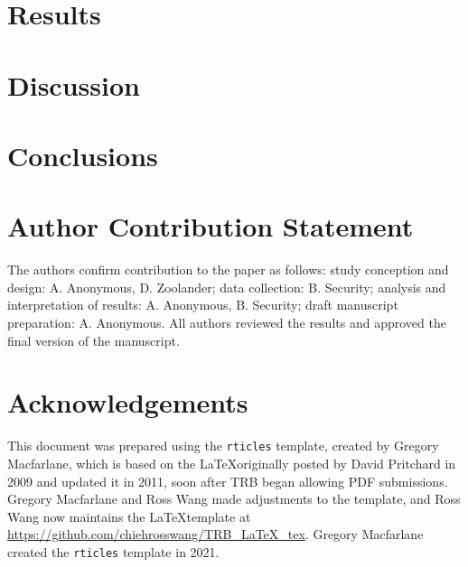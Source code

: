 \documentclass[numbered]{trbunofficial}
\begin{document}
\hypertarget{results}{%
\section{Results}\label{results}}

\hypertarget{discussion}{%
\section{Discussion}\label{discussion}}

\hypertarget{conclusions}{%
\section{Conclusions}\label{conclusions}}

\hypertarget{author-contribution-statement}{%
\section{Author Contribution
Statement}\label{author-contribution-statement}}

The authors confirm contribution to the paper as follows: study
conception and design: A. Anonymous, D. Zoolander; data collection: B.
Security; analysis and interpretation of results: A. Anonymous, B.
Security; draft manuscript preparation: A. Anonymous. All authors
reviewed the results and approved the final version of the manuscript.

\hypertarget{acknowledgements}{%
\section{Acknowledgements}\label{acknowledgements}}

This document was prepared using the \texttt{rticles} template, created
by Gregory Macfarlane, which is based on the \LaTeX originally posted by
David Pritchard in 2009 and updated it in 2011, soon after TRB began
allowing PDF submissions. Gregory Macfarlane and Ross Wang made
adjustments to the template, and Ross Wang now maintains the
\LaTeX template at \url{https://github.com/chiehrosswang/TRB_LaTeX_tex}.
Gregory Macfarlane created the \texttt{rticles} template in 2021.

\newpage
\renewcommand\refname{References}

\end{document}
